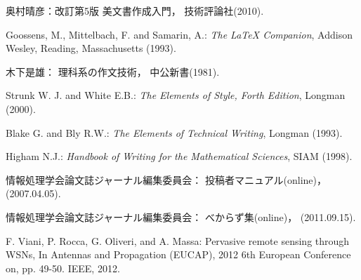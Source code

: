 \documentclass[submit,techrep]{ipsj}
\begin{document}
{%


\begin{thebibliography}{10}



奥村晴彦：改訂第5版 \LaTeXe 美文書作成入門，
技術評論社(2010).

Goossens, M., Mittelbach, F. and Samarin, A.:
{\it The LaTeX Companion},
Addison Wesley, Reading, Massachusetts (1993).

木下是雄：
理科系の作文技術，
中公新書(1981).

Strunk W. J. and White E.B.:
{\it The Elements of Style, Forth Edition},
Longman (2000).

Blake G. and Bly R.W.:
{\it The Elements of Technical Writing},
Longman (1993).

Higham N.J.:
{\it Handbook of Writing for the Mathematical Sciences},
SIAM (1998).

情報処理学会論文誌ジャーナル編集委員会：
投稿者マニュアル(online)，
(2007.04.05).

情報処理学会論文誌ジャーナル編集委員会：
べからず集(online)，
(2011.09.15).
\fi

F. Viani, P. Rocca, G. Oliveri, and A. Massa:
Pervasive remote sensing through WSNs, In Antennas and Propagation (EUCAP), 2012 6th European Conference on, pp. 49-50. IEEE, 2012.



\end{thebibliography}}
\end{document}
